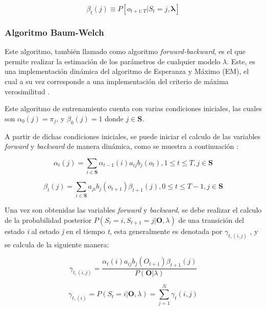     \begin{equation}
        \beta_{t}(j) \equiv P \left[ o_{t+1:T} \vert S_{t} = j, \boldsymbol\lambda \right]
    \end{equation}


\subsubsection{Algoritmo Baum-Welch}

Este algoritmo, también llamado como algoritmo \textit{forward-backward}, es el que permite realizar la estimación de los parámetros de cualquier modelo $\lambda$. Este, es una implementación dinámica del algoritmo de Esperanza y Máximo (EM), el cual a su vez corresponde a una implementación del criterio de máxima verosimilitud \cite{Panuccio2002}. 

Este algoritmo de entrenamiento cuenta con varias condiciones iniciales, las cuales son $\alpha_{0}(j)=\pi_{j}$, y $\beta_{0}(j)=1$ donde $j \in \textbf{S}$. 

A partir de dichas condiciones iniciales, se puede iniciar el calculo de las variables \textit{forward} y \textit{backward} de manera dinámica, como se muestra a continuación \cite{Yu2016}:

    \begin{equation}
        \alpha_{t}(j) = \sum_{i \in \textbf{S}} \alpha_{t-1}(i) a_{ij} b_{j}(o_{t}), 1 \leq t \leq T, j \in \textbf{S}
    \end{equation}
    
    \begin{equation}
        \beta_{t}(j) = \sum_{i \in \textbf{S}} a_{ji} b_{j}(o_{t+1}) \beta_{t+1}(j), 0 \leq t \leq T - 1, j \in \textbf{S}
    \end{equation}
    
Una vez son obtenidas las variables \textit{forward} y \textit{backward}, se debe realizar el calculo de la probabilidad posterior $P(S_{t}=i, S_{t+1}=j | \textbf{O}, \lambda)$ de una transición del estado \textit{i} al estado \textit{j} en el tiempo \textit{t}, esta generalmente es denotada por $\gamma_{t,(i,j)}$ \cite{Fink2014}, y se calcula de la siguiente manera:

    \begin{equation}
        \gamma_{t,(i,j)} = \dfrac{ \alpha_{t}(i) a_{ij} b_{j}(O_{t+1}) \beta_{t+1}(j) }{P(\textbf{O} | \lambda)}
    \end{equation}
    
    \begin{equation}
        \gamma_{t,(i)} = P(S_{t} = i | \textbf{O}, \lambda) = \sum_{j = 1}^{N} \gamma_{t}(i, j)
    \end{equation}

